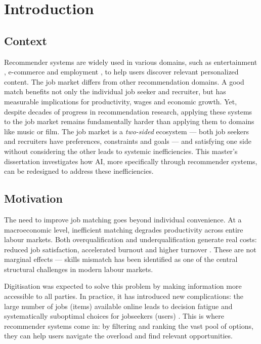 \chapter{Introduction}
\label{chap:intro}

\section{Context}

Recommender systems are widely used in various domains, such as entertainment \cite{ytrecommender}, e-commerce \cite{recommenderecommerce} and employment \cite{celik2025jobrecommendersystemssystematic}, to help users discover relevant personalized content. The job market differs from other recommendation domains. A good match benefits not only the individual job seeker and recruiter, but has measurable implications for productivity, wages and economic growth. Yet, despite decades of progress in recommendation research, applying these systems to the job market remains fundamentally harder than applying them to domains like music or film. The job market is a \emph{two-sided} ecosystem --- both job seekers and recruiters have preferences, constraints and goals --- and satisfying one side without considering the other leads to systemic inefficiencies. This master's dissertation investigates how \gls{AI}, more specifically through recommender systems, can be redesigned to address these inefficiencies.

\section{Motivation}
\label{sec:intro:motivation}

The need to improve job matching goes beyond individual convenience. At a macroeconomic level, inefficient matching degrades productivity across entire labour markets. Both overqualification and underqualification generate real costs: reduced job satisfaction, accelerated burnout and higher turnover \cite{cedefop_skills}. These are not marginal effects --- skills mismatch has been identified as one of the central structural challenges in modern labour markets.

Digitisation was expected to solve this problem by making information more accessible to all parties. In practice, it has introduced new complications: the large number of jobs (items) available online leads to decision fatigue and systematically suboptimal choices for jobseekers (users) \cite{nurfadillah2026analysis}. This is where recommender systems come in: by filtering and ranking the vast pool of options, they can help users navigate the overload and find relevant opportunities.

